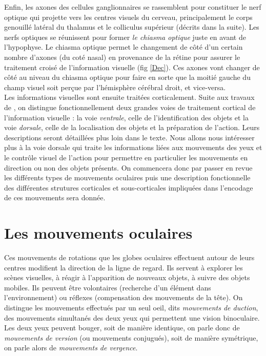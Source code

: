 Enfin, les axones des cellules ganglionnaires se rassemblent pour constituer le nerf optique \cite{Purves:2004} qui projette vers les centres visuels du cerveau, principalement le corps genouillé latéral du thalamus et le colliculus supérieur (décrits dans la suite). Les nerfs optiques se réunissent pour former \textit{le chiasma optique} juste en avant de l'hypophyse. Le chiasma optique permet le changement de côté d'un certain nombre d'axones (du coté nasal) en provenance de la rétine  pour assurer le traitement croisé de l'information visuelle (fig \ref{Dec}). Ces axones vont changer de côté au niveau du chiasma optique pour faire en sorte que la moitié gauche du champ visuel soit perçue par l'hémisphère cérébral droit, et vice-versa.\\%

Les informations visuelles sont ensuite traitées corticalement. Suite aux travaux de \cite{Ungerleider:1982}, on distingue fonctionnellement deux grandes voies de traitement cortical de l'information visuelle : la voie \textit{ventrale}, celle de l'identification des objets et la voie \textit{dorsale}, celle de la localisation des objets et la préparation de l'action. Leurs descriptions seront détaillées plus loin dans le texte. Nous allons nous intéresser plus à la voie dorsale qui traite les informations liées aux mouvements des yeux et le contrôle visuel de l'action pour permettre en particulier les mouvements en direction ou non des objets présents. On commencera donc par passer en revue les différents types de mouvements oculaires puis une description fonctionnelle des différentes strutures corticales et sous-corticales impliquées dans l'encodage de ces mouvements sera donnée. 

\section{Les mouvements oculaires}

Ces mouvements de rotations que les globes oculaires effectuent autour de leurs centres modifient la direction de la ligne de regard. Ils servent à explorer les scènes visuelles, à réagir à l'apparition de nouveaux objets, à suivre des objets mobiles. Ils peuvent être volontaires (recherche d'un élément dans l'environnement) ou réflexes (compensation des mouvements de la tête). On distingue les mouvements effectués par un seul oeil, dits \textit{mouvements de duction}, des mouvements simultanés des deux yeux qui permettent une vision binoculaire. Les deux yeux peuvent bouger, soit de manière identique, on parle donc de \textit{mouvements de version} (ou mouvements conjugués), soit de manière symétrique, on parle alors de \textit{mouvements de vergence}. \\

